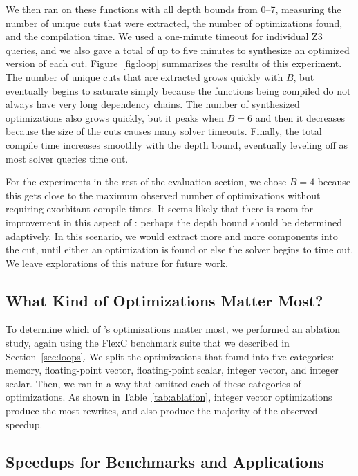 We then ran \minotaur{} on these functions with all depth bounds from
0--7, measuring the number of unique cuts that were extracted, the
number of optimizations found, and the compilation time.
%
We used a one-minute timeout for individual Z3 queries, and we also
gave \minotaur{} a total of up to five minutes to synthesize an optimized
version of each cut.
%
Figure~\ref{fig:loop} summarizes the results of this experiment.
%
The number of unique cuts that are extracted grows quickly with $B$,
but eventually begins to saturate simply because the functions being
compiled do not always have very long dependency chains.
%
The number of synthesized optimizations also grows quickly, but it
peaks when $B=6$ and then it decreases because the size of the cuts
causes many solver timeouts.
%
Finally, the total compile time increases smoothly with the depth
bound, eventually leveling off as most solver queries time out.


For the experiments in the rest of the evaluation section, we chose
$B=4$ because this gets close to the maximum observed number of
optimizations without requiring exorbitant compile times.
%
It seems likely that there is room for improvement in this aspect of
\minotaur: perhaps the depth bound should be determined adaptively.
%
In this scenario, we would extract more and more components into the
cut, until either an optimization is found or else the solver begins
to time out.
%
We leave explorations of this nature for future work.


\subsection{What Kind of Optimizations Matter Most?}

To determine which of \minotaur's optimizations matter most, we performed
an ablation study, again using the FlexC benchmark suite that we
described in Section~\ref{sec:loops}.
%
We split the optimizations that \minotaur{} found into five
categories: memory, floating-point vector, floating-point scalar,
integer vector, and integer scalar.
%
Then, we ran \minotaur{} in a way that omitted each of these categories of
optimizations.
%
As shown in Table~\ref{tab:ablation}, integer vector optimizations
produce the most rewrites, and also produce the majority of the
observed speedup.


\subsection{Speedups for Benchmarks and Applications}

